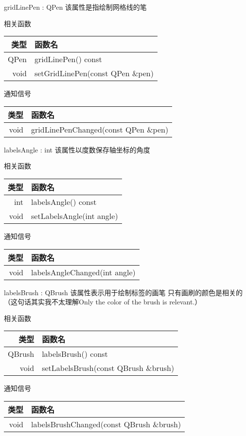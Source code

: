 gridLinePen : QPen 该属性是指绘制网格线的笔

相关函数

\begin{tabular}{|r|l|}
\hline
类型&函数名\\ 
\hline
QPen&	gridLinePen() const\\
\hline
void&	setGridLinePen(const QPen \&pen)\\
\hline
\end{tabular}

通知信号

\begin{tabular}{|r|l|}
\hline
类型&函数名\\ 
\hline
void	&gridLinePenChanged(const QPen \&pen)\\
\hline
\end{tabular}

labelsAngle : int 该属性以度数保存轴坐标的角度

相关函数

\begin{tabular}{|r|l|}
\hline
类型&函数名\\ 
\hline
int	& 	labelsAngle() const\\
\hline
void & setLabelsAngle(int angle)\\
\hline
\end{tabular}


通知信号

\begin{tabular}{|r|l|}
\hline
类型&函数名\\ 
\hline
void & labelsAngleChanged(int angle)\\
\hline
\end{tabular}

labelsBrush : QBrush 该属性表示用于绘制标签的画笔 只有画刷的颜色是相关的（这句话其实我不太理解Only the color of the brush is relevant.）

相关函数

\begin{tabular}{|r|l|}
\hline
类型&函数名\\ 
\hline
QBrush	&labelsBrush() const\\
\hline
void & setLabelsBrush(const QBrush \&brush)\\
\hline
\end{tabular}

通知信号

\begin{tabular}{|r|l|}
\hline
类型&函数名\\ 
\hline
void &	labelsBrushChanged(const QBrush \&brush)\\
\hline
\end{tabular}

